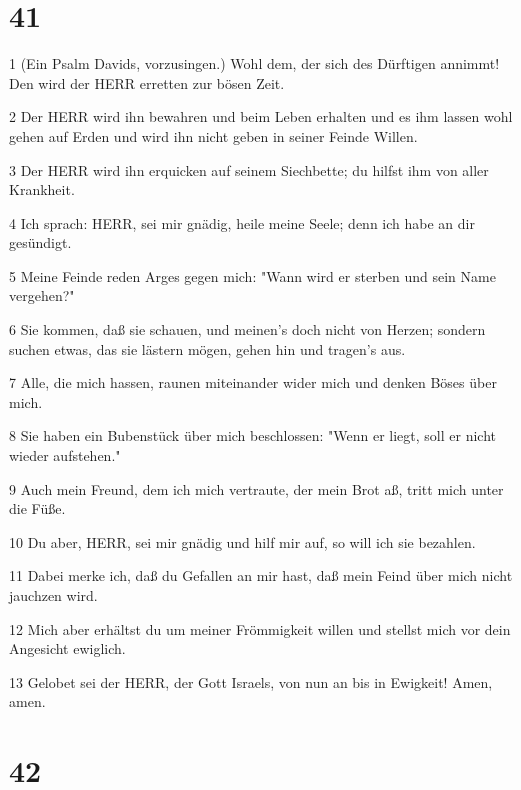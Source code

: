 \chapter{41}

\par 1 (Ein Psalm Davids, vorzusingen.) Wohl dem, der sich des Dürftigen annimmt! Den wird der HERR erretten zur bösen Zeit.
\par 2 Der HERR wird ihn bewahren und beim Leben erhalten und es ihm lassen wohl gehen auf Erden und wird ihn nicht geben in seiner Feinde Willen.
\par 3 Der HERR wird ihn erquicken auf seinem Siechbette; du hilfst ihm von aller Krankheit.
\par 4 Ich sprach: HERR, sei mir gnädig, heile meine Seele; denn ich habe an dir gesündigt.
\par 5 Meine Feinde reden Arges gegen mich: "Wann wird er sterben und sein Name vergehen?"
\par 6 Sie kommen, daß sie schauen, und meinen's doch nicht von Herzen; sondern suchen etwas, das sie lästern mögen, gehen hin und tragen's aus.
\par 7 Alle, die mich hassen, raunen miteinander wider mich und denken Böses über mich.
\par 8 Sie haben ein Bubenstück über mich beschlossen: "Wenn er liegt, soll er nicht wieder aufstehen."
\par 9 Auch mein Freund, dem ich mich vertraute, der mein Brot aß, tritt mich unter die Füße.
\par 10 Du aber, HERR, sei mir gnädig und hilf mir auf, so will ich sie bezahlen.
\par 11 Dabei merke ich, daß du Gefallen an mir hast, daß mein Feind über mich nicht jauchzen wird.
\par 12 Mich aber erhältst du um meiner Frömmigkeit willen und stellst mich vor dein Angesicht ewiglich.
\par 13 Gelobet sei der HERR, der Gott Israels, von nun an bis in Ewigkeit! Amen, amen.

\chapter{42}

